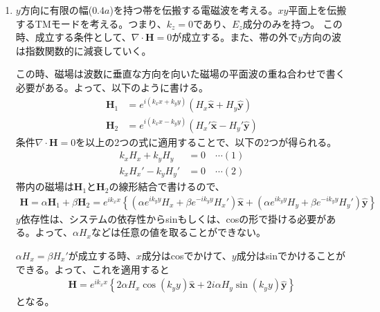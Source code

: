 \documentclass[a4paper,11pt,dvipdfmx]{jsarticle}
\begin{document}
\begin{enumerate}
\begin{itemize}
\begin{proof}
            \begin{align*}
              \boldsymbol{R}_{\perp} = \frac{l - n}{6} \hat{\boldsymbol{x}'} + \frac{m - n }{6} \hat{\boldsymbol{y}'}
            \end{align*}
            となる。$\hat{\boldsymbol{x}'}$と$\hat{\boldsymbol{y}'}$のなす角は、120°だから(111)面に射影すると120°ずつ分布し、三角格子となる。
          \end{proof}
      \end{itemize}
      \item $y$方向に有限の幅($0.4a$)を持つ帯を伝搬する電磁波を考える。$xy$平面上を伝搬するTMモードを考える。つまり、$k_z = 0であり、 E_z$成分のみを持つ。
        この時、成立する条件として、$\nabla \cdot \mathbf{H}=0$が成立する。また、帯の外で$y$方向の波は指数関数的に減衰していく。

        この時、磁場は波数に垂直な方向を向いた磁場の平面波の重ね合わせで書く必要がある。よって、以下のように書ける。
        \begin{align*}
          \mathbf{H}_1 &= e^{i(k_x x + k_y y)}(H_x \hat{\boldsymbol{x}} + H_y \hat{\boldsymbol{y}}) \\
          \mathbf{H}_2 &= e^{i(k_x x - k_y y)}(H_x' \hat{\boldsymbol{x}} - H_y' \hat{\boldsymbol{y}}) 
        \end{align*}
        条件$\nabla \cdot \mathbf{H}=0$を以上の2つの式に適用することで、以下の2つが得られる。
        \begin{align*}
          k_x H_x + k_y H_y &= 0 \quad \cdots (1) \\
          k_x H_x' - k_y H_y' &= 0 \quad \cdots (2)
        \end{align*}
        帯内の磁場は$\mathbf{H}_1$と$\mathbf{H}_2$の線形結合で書けるので、
        \begin{align*}
          \mathbf{H} = \alpha \mathbf{H}_1 + \beta \mathbf{H}_2 = e^{ik_x x} \left\{ (\alpha e^{ik_y y} H_x + \beta e^{- i k_y y} H_x' ) \hat{\boldsymbol{x}}  + (\alpha e^{ik_y y} H_y + \beta e^{- i k_y y} H_y' ) \hat{\boldsymbol{y}}\right\}
        \end{align*}
        $y$依存性は、システムの依存性からsinもしくは、cosの形で掛ける必要がある。よって、$\alpha H_x$などは任意の値を取ることができない。

        $\alpha H_x = \beta H_x'$が成立する時、$x$成分はcosでかけて、$y$成分はsinでかけることができる。よって、これを適用すると
        \begin{align*}
          \mathbf{H} = e^{i k_x x} \left\{ 2 \alpha H_x \cos \left( k_y y \right) \hat{\boldsymbol{x}} + 2 i \alpha H_y \sin \left( k_y y \right) \hat{\boldsymbol{y}} \right\}
        \end{align*}
        となる。


\end{enumerate}
\end{document}
